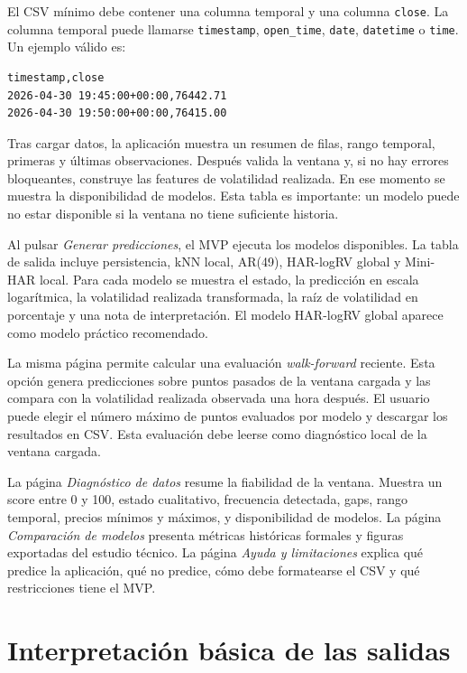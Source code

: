 El CSV mínimo debe contener una columna temporal y una columna \texttt{close}. La columna temporal puede llamarse \texttt{timestamp}, \texttt{open\_\allowbreak time}, \texttt{date}, \texttt{datetime} o \texttt{time}. Un ejemplo válido es:

\begin{verbatim}
timestamp,close
2026-04-30 19:45:00+00:00,76442.71
2026-04-30 19:50:00+00:00,76415.00
\end{verbatim}

Tras cargar datos, la aplicación muestra un resumen de filas, rango temporal, primeras y últimas observaciones. Después valida la ventana y, si no hay errores bloqueantes, construye las features de volatilidad realizada. En ese momento se muestra la disponibilidad de modelos. Esta tabla es importante: un modelo puede no estar disponible si la ventana no tiene suficiente historia.

Al pulsar \textit{Generar predicciones}, el MVP ejecuta los modelos disponibles. La tabla de salida incluye persistencia, kNN local, AR(49), HAR-logRV global y Mini-HAR local. Para cada modelo se muestra el estado, la predicción en escala logarítmica, la volatilidad realizada transformada, la raíz de volatilidad en porcentaje y una nota de interpretación. El modelo HAR-logRV global aparece como modelo práctico recomendado.

La misma página permite calcular una evaluación \textit{walk-forward} reciente. Esta opción genera predicciones sobre puntos pasados de la ventana cargada y las compara con la volatilidad realizada observada una hora después. El usuario puede elegir el número máximo de puntos evaluados por modelo y descargar los resultados en CSV. Esta evaluación debe leerse como diagnóstico local de la ventana cargada.

La página \textit{Diagnóstico de datos} resume la fiabilidad de la ventana. Muestra un score entre 0 y 100, estado cualitativo, frecuencia detectada, gaps, rango temporal, precios mínimos y máximos, y disponibilidad de modelos. La página \textit{Comparación de modelos} presenta métricas históricas formales y figuras exportadas del estudio técnico. La página \textit{Ayuda y limitaciones} explica qué predice la aplicación, qué no predice, cómo debe formatearse el CSV y qué restricciones tiene el MVP.

\section{Interpretación básica de las salidas}\label{sec:interpretacion-salida}

